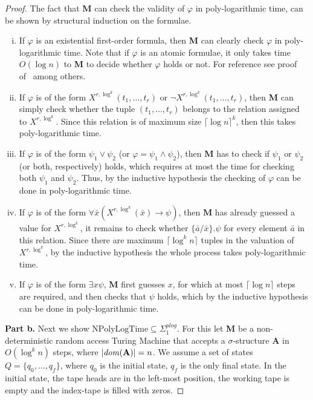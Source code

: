 \documentclass{article}
\newcommand{\npolylog}{\mathrm{NPolyLogTime}}
\begin{document}
\begin{proof}
    
The fact that \textbf{M} can check the validity of $\varphi$ in poly-logarithmic time, can be shown by structural induction on the formulae.   
\begin{enumerate}[i.]
\item If $\varphi$ is an existential first-order formula, then \textbf{M} can clearly check $\varphi$ in poly-logarithmic time. Note that if $\varphi$ is an atomic formulae, it only takes time $O(\log n)$ to \textbf{M} to decide whether $\varphi$ holds or not. For reference see proof of~\cite[Theorem 5.30]{Immerman99} among others.
\item If $\varphi$ is of the form $X^{r,\log^k}(t_1, \ldots, t_r)$ or $\neg X^{r,\log^k}(t_1, \ldots, t_r)$, then \textbf{M} can simply check whether the tuple $(t_1, \ldots, t_r)$ belongs to the relation assigned to $X^{r,\log^k}$. Since this relation is of maximum size $\lceil\log n\rceil^k$, then this takes poly-logarithmic time.
\item If $\varphi$ is of the form $\psi_1 \vee \psi_2$ (or $\varphi = \psi_1 \wedge \psi_2$), then \textbf{M} has to check if $\psi_1$ or $\psi_2$ (or both, respectively) holds, which requires at most the time for checking both $\psi_1$ and $\psi_2$. Thus, by the inductive hypothesis the checking of $\varphi$ can be done in poly-logarithmic time.
\item If $\varphi$ is of the form $\forall \bar{x} (X^{r,\log^k}(\bar{x}) \rightarrow \psi)$, then $\textbf{M}$ has already guessed a value for $X^{r,\log^{k}}$, it remains to check whether $\{ \bar{a} / \bar{x} \} . \psi$ for every element $\bar{a}$ in this relation. Since there are maximum $\lceil \log^k n \rceil$ tuples in the valuation of $X^{r,\log^{k}}$, by the inductive hypothesis the whole process takes poly-logarithmic time.
\item If $\varphi$ is of the form $\exists x \psi$, \textbf{M} first guesses $x$, for which at most $\lceil \log n \rceil$ steps are required, and then checks that $\psi$ holds, which by the inductive hypothesis can be done in poly-logarithmic time.  
\end{enumerate}
    
    
    
  

\noindent
\textbf{Part b.} Next we show $\npolylog  \subseteq \Sigma^{\mathit{plog}}_1$. For this let \textbf{M} be a non-deterministic random access Turing Machine that accepts a $\sigma$-structure \textbf{A} in $O(\log^k n)$ steps, where $|\mathit{dom}({\bf A})| = n$. We assume a set of states $Q = \{ q_0,\dots,q_f \}$, where $q_0$ is the initial state, $q_f$ is the only final state. In the initial state, the tape heads are in the left-most position, the working tape is empty and the index-tape is filled with zeros.


\end{proof}
\end{document}

